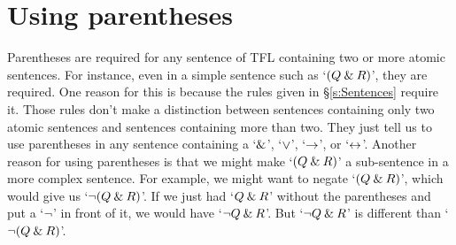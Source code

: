 \begin{comment}
\subsection{Scope}

Finally, let's define the \define{scope} of a logical operator. Basically, the scope of a logical operator is the part of the sentence to which the operator applies (or as Lemmon says, ``what a particular occurrence of a connective controls''). We give the precise definition in terms of the main logical operator for the whole sentence and the main logical operators for any sub-sentences contained therein. 

\begin{factboxy}{Scope}
The \define{scope} of a logical operator is the sentence or sub-sentence for which that logical operator is the main logical operator.\\
Alternatively, Lemmon defines the \textit{scope of a logical operator} as `the shortest sentence in which the logical operator appears'.
\end{factboxy}

The scope of the main logical operator is always the entire sentence. The scope of every other logical operator is a sub-sentence. Consider this sentence:

$$(\enot(R \eand T) \eiff (P \eif \enot Q))$$

The main logical operator is the `$\eiff$'. Therefore, the scope of `$\eiff$' is the entire sentence. 
The scope of the `$\enot$' is `$\enot(R \eand T)$', which means that `$\enot$' is the main logical operator for that sub-sentence. 
Similarly, the `$\eand$' is the main logical operator for just the `$(R \eand T)$', and so the scope of the `$\eand$' is `$(R \eand T)$'. 
The `$\eif$' is the main logical operator for `$(P \eif \enot Q)$'. And the `$\enot$' is the main logical operator for `$\enot Q$'. Hence, the scope of each are those respective sub-sentences. 

\end{comment}


\section{Using parentheses}
\label{TFLconventions}

Parentheses are required for any sentence of TFL containing two or more atomic sentences. For instance, even in a simple sentence such as `$(Q \mathbin{\&} R)$', they are required. One reason for this is because the rules given in \S\ref{s:Sentences} require it. Those rules don't make a distinction between sentences containing only two atomic sentences and sentences containing more than two. They just tell us to use parentheses in any sentence containing a `$\mathbin{\&}$', `$\vee$', `$\rightarrow$', or `$\leftrightarrow$'. Another reason for using parentheses is that we might make `$(Q \mathbin{\&} R)$' a sub-sentence in a more complex sentence. For example, we might want to negate `$(Q \mathbin{\&} R)$', which would give us `${\neg}(Q \mathbin{\&} R)$'. If we just had `$Q \mathbin{\&} R$' without the parentheses and put a `${\neg}$' in front of it, we would have `${\neg} Q \mathbin{\&} R$'. But `${\neg} Q \mathbin{\&} R$' is different than `${\neg}(Q\mathbin{\&} R)$'. 

